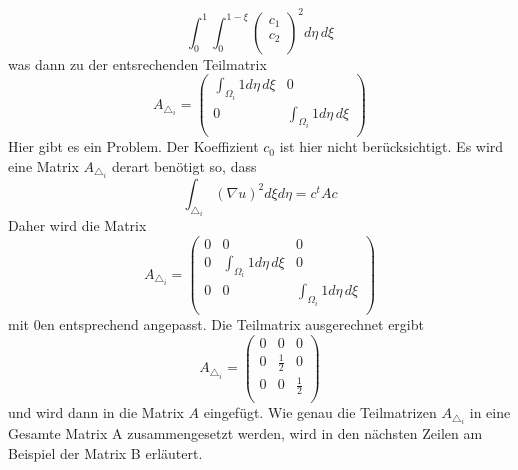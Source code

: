 \begin{equation}
			\int_0^1 \int_0^{1 - \xi} \left( \begin{array}{c} c_1 \\ c_2 \\	
\end{array} \right)^2 d\eta \, d\xi
			\label{fem:Minimal2LinAlgA}
\end{equation}
was dann zu der entsrechenden Teilmatrix
\begin{equation}
	A_{\triangle_i} = \left( \begin{array}{cc}
	\int_{\Omega_i} 1 d\eta \, d\xi & 0  \\ 
	0 & \int_{\Omega_i} 1 d\eta \, d\xi  \\
	\end{array}\right)
	\label{fem:TeilmatrixA}
\end{equation}
Hier gibt es ein Problem. Der Koeffizient $c_0$ ist hier nicht berücksichtigt. Es wird eine Matrix $A_{\triangle_i}$ derart benötigt so, dass
 \begin{equation}
	\int_{\triangle_i} (\nabla u)^2 d\xi d\eta = c^tAc
	\label{fem:KeiAhnig}
\end{equation}
Daher wird die Matrix
\begin{equation}
	A_{\triangle_i} = \left( \begin{array}{ccc}
	0 & 0 & 0 \\
	0 &  \int_{\Omega_i} 1 d\eta \, d\xi & 0  \\ 
	0 & 0 & \int_{\Omega_i} 1 d\eta \, d\xi  \\
	\end{array}\right)
	\label{fem:TeilmatrixA}
\end{equation}
mit $0$en entsprechend angepasst. Die Teilmatrix ausgerechnet ergibt
\begin{equation}
	A_{\triangle_i} = \left( \begin{array}{ccc}
	0 & 0 & 0 \\
	0 & \frac{1}{2} & 0  \\ 
	0 & 0 &  \frac{1}{2}\\
	\end{array}\right)
\end{equation}
und wird dann in die Matrix $A$ eingefügt. Wie genau die Teilmatrizen $A_{\triangle_i}$ in eine Gesamte Matrix A zusammengesetzt werden, wird in den nächsten Zeilen am Beispiel der Matrix B erläutert. 

